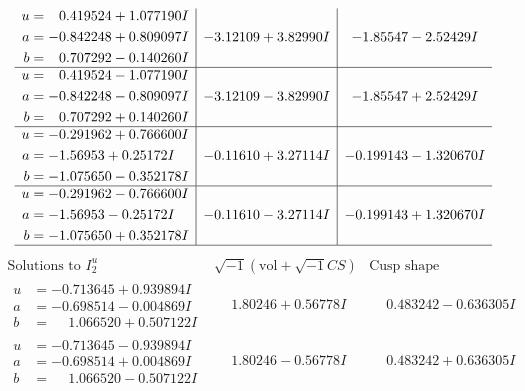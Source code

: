 \documentclass[1p]{elsarticle_modified}
\theoremstyle{definition}
\newcommand{\I}{\sqrt{-1}}
\begin{document}
$$\begin{array}{c|c|c}
\begin{aligned}
u &= \phantom{-}0.419524 + 1.077190 I \\
a &= -0.842248 + 0.809097 I \\
b &= \phantom{-}0.707292 - 0.140260 I\end{aligned}
 & -3.12109 + 3.82990 I & -1.85547 - 2.52429 I \\ \hline\begin{aligned}
u &= \phantom{-}0.419524 - 1.077190 I \\
a &= -0.842248 - 0.809097 I \\
b &= \phantom{-}0.707292 + 0.140260 I\end{aligned}
 & -3.12109 - 3.82990 I & -1.85547 + 2.52429 I \\ \hline\begin{aligned}
u &= -0.291962 + 0.766600 I \\
a &= -1.56953 + 0.25172 I \\
b &= -1.075650 - 0.352178 I\end{aligned}
 & -0.11610 + 3.27114 I & -0.199143 - 1.320670 I \\ \hline\begin{aligned}
u &= -0.291962 - 0.766600 I \\
a &= -1.56953 - 0.25172 I \\
b &= -1.075650 + 0.352178 I\end{aligned}
 & -0.11610 - 3.27114 I & -0.199143 + 1.320670 I\\
 \hline 
 \end{array}$$\newpage$$\begin{array}{c|c|c}  
\text{Solutions to }I^u_{2}& \I (\text{vol} + \sqrt{-1}CS) & \text{Cusp shape}\\
 \hline 
\begin{aligned}
u &= -0.713645 + 0.939894 I \\
a &= -0.698514 - 0.004869 I \\
b &= \phantom{-}1.066520 + 0.507122 I\end{aligned}
 & \phantom{-}1.80246 + 0.56778 I & \phantom{-}0.483242 - 0.636305 I \\ \hline\begin{aligned}
u &= -0.713645 - 0.939894 I \\
a &= -0.698514 + 0.004869 I \\
b &= \phantom{-}1.066520 - 0.507122 I\end{aligned}
 & \phantom{-}1.80246 - 0.56778 I & \phantom{-}0.483242 + 0.636305 I \\ \hline\begin{aligned}

\end{aligned}
\end{array}$$
\end{document}
